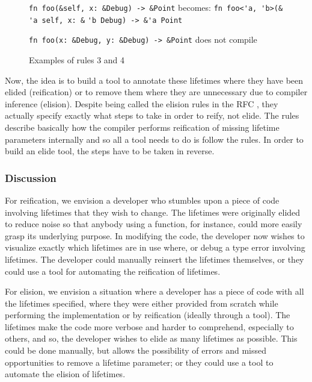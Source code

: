 \begin{figure}
{\verb|fn foo(&self, x: &Debug) -> &Point|}\newline
becomes:\newline
{\verb|fn foo<'a, 'b>(&|}
{\color{green} \verb|'a|}{\verb| self, x: &|}{\color{red} \verb|'b|}{\verb| Debug) -> &|}{\color{blue}\verb|'a|}{\verb| Point|}


\vspace{4mm}
{\verb|fn foo(x: &Debug, y: &Debug) -> &Point|}\newline
does not compile

\caption{Examples of rules 3 and 4}
\label{Fig:lifetimes4}
\end{figure}

Now, the idea is to build a tool to annotate these lifetimes where they have been elided (reification) or to remove them where they are unnecessary due to compiler inference (elision). Despite being called the elision rules in the RFC \cite{elisionrules}, they actually specify exactly what steps to take in order to reify, not elide. The rules describe basically how the compiler performs reification of missing lifetime parameters internally and so all a tool needs to do is follow the rules. In order to build an elide tool, the steps have to be taken in reverse.


\subsubsection{Discussion}

For reification, we envision a developer who stumbles upon a piece of code involving lifetimes that they wish to change. The lifetimes were originally elided to reduce noise so that anybody using a function, for instance, could more easily grasp its underlying purpose. In modifying the code, the developer now wishes to visualize exactly which lifetimes are in use where, or debug a type error involving lifetimes. The developer could manually reinsert the lifetimes themselves, or they could use a tool for automating the reification of lifetimes.

For elision, we envision a situation where a developer has a piece of code with all the lifetimes specified, where they were either provided from scratch while performing the implementation or by reification (ideally through a tool). The lifetimes make the code more verbose and harder to comprehend, especially to others, and so, the developer wishes to elide as many lifetimes as possible. This could be done manually, but allows the possibility of errors and missed opportunities to remove a lifetime parameter; or they could use a tool to automate the elision of lifetimes. 

